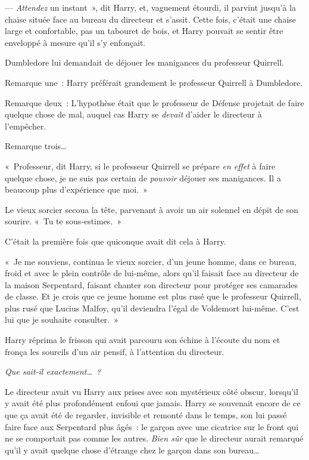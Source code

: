 --- \emph{Attendez} un instant~», dit Harry, et, vaguement étourdi, il parvint jusqu'à la chaise située face au bureau du directeur et s'assit. Cette fois, c'était une chaise large et confortable, pas un tabouret de bois, et Harry pouvait se sentir être enveloppé à mesure qu'il s'y enfonçait.

Dumbledore lui demandait de déjouer les manigances du professeur Quirrell.

Remarque une~: Harry préférait grandement le professeur Quirrell à Dumbledore.

Remarque deux~: L'hypothèse était que le professeur de Défense projetait de faire quelque chose de mal, auquel cas Harry se \emph{devait} d'aider le directeur à l'empêcher.

Remarque trois…

«~Professeur, dit Harry, si le professeur Quirrell se prépare \emph{en effet} à faire quelque chose, je ne suis pas certain de \emph{pouvoir} déjouer ses manigances. Il a beaucoup plus d'expérience que moi.~»

Le vieux sorcier secoua la tête, parvenant à avoir un air solennel en dépit de son sourire. «~Tu te sous-estimes.~»

C'était la première fois que quiconque avait dit cela à Harry.

«~Je me souviens, continua le vieux sorcier, d'un jeune homme, dans ce bureau, froid et avec le plein contrôle de lui-même, alors qu'il faisait face au directeur de la maison Serpentard, faisant chanter son directeur pour protéger ses camarades de classe. Et je crois que ce jeune homme est plus rusé que le professeur Quirrell, plus rusé que Lucius Malfoy, qu'il deviendra l'égal de Voldemort lui-même. C'est lui que je souhaite consulter.~»

Harry réprima le frisson qui avait parcouru son échine à l'écoute du nom et fronça les sourcils d'un air pensif, à l'attention du directeur.

\emph{Que sait-il exactement…~?}

Le directeur avait vu Harry aux prises avec son mystérieux côté obscur, lorsqu'il y avait été plus profondément enfoui que jamais. Harry se souvenait encore de ce que ça avait été de regarder, invisible et remonté dans le temps, son lui passé faire face aux Serpentard plus âgés~: le garçon avec une cicatrice sur le front qui ne se comportait pas comme les autres. \emph{Bien sûr} que le directeur aurait remarqué qu'il y avait quelque chose d'étrange chez le garçon dans son bureau…

